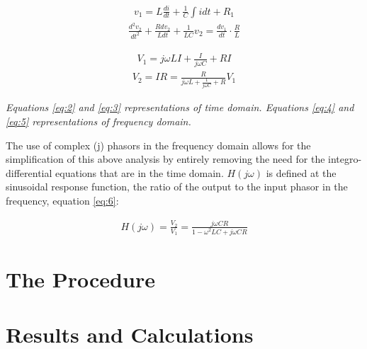 \documentclass[12pt]{article}
\begin{document}
\newpage
\hspace{2ex}
\begin{minipage}{0.45\textwidth}
    \begin{gather}
        v_1=L\frac{di}{dt}+\frac1C\int idt+R_1\label{eq:2}
    \end{gather}
    \vspace{-1.5em}
    \begin{gather}
        \frac{d^2v_2}{dt^2} + \frac{R dv_2}{L dt} + \frac{1}{LC} v_2 = \frac{dv_1}{dt} \cdot \frac{R}{L}\label{eq:3}
    \end{gather}
\end{minipage}
\hspace{-1.5ex}
\begin{minipage}{0.45\textwidth}
    \begin{gather}
        V_1 = j \omega L I + \frac{I}{j \omega C} + RI\label{eq:4}
    \end{gather}
    \vspace{-1.5em}
    \begin{gather}\label{eq:5}
        V_2 = IR = \frac{R}{j \omega L + \frac{1}{j \omega C} + R} V_1
    \end{gather}
\end{minipage}

\textit{Equations \ref{eq:2} and \ref{eq:3} representations of time domain. Equations \ref{eq:4} and \ref{eq:5} representations of frequency domain.} \cite{UCD}

The use of complex (j) phasors in the frequency domain allows for the simplification of this above analysis by entirely removing
the need for the integro-differential equations that are in the time domain. $H(j \omega)$ is defined at the sinusoidal response function, 
the ratio of the output to the input phasor in the frequency, equation \ref{eq:6}:

\begin{gather} \label{eq:6}
    H (j \omega) = \frac{V_2}{V_1} = \frac{j \omega C R}{1 - \omega^2 L C + j \omega C R}
\end{gather}

\section{The Procedure}



\section{Results and Calculations}
\end{document}
